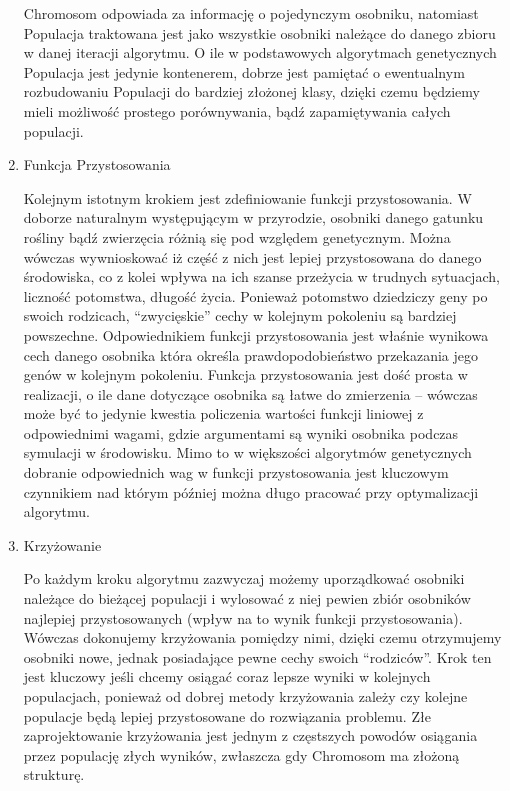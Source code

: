 \begin{par}
\begin{enumerate}
\begin{par}
		Chromosom odpowiada za informację o pojedynczym osobniku, natomiast Populacja traktowana jest jako wszystkie osobniki należące do danego zbioru w danej iteracji algorytmu. 
		O ile w podstawowych algorytmach genetycznych Populacja jest jedynie kontenerem, dobrze jest pamiętać o ewentualnym rozbudowaniu Populacji do bardziej złożonej klasy, dzięki czemu będziemy mieli możliwość prostego porównywania, bądź zapamiętywania całych populacji.
	\end{par}
\item Funkcja Przystosowania
	\begin{par}
		Kolejnym istotnym krokiem jest zdefiniowanie funkcji przystosowania.
		W doborze naturalnym występującym w przyrodzie, osobniki danego gatunku rośliny bądź zwierzęcia różnią się pod względem genetycznym. 
		Można wówczas wywnioskować iż część z nich jest lepiej przystosowana do danego środowiska, co z kolei wpływa na ich szanse przeżycia w trudnych sytuacjach, liczność potomstwa, długość życia.
		Ponieważ potomstwo dziedziczy geny po swoich rodzicach, ``zwycięskie'' cechy w kolejnym pokoleniu są bardziej powszechne.
		Odpowiednikiem funkcji przystosowania jest właśnie wynikowa cech danego osobnika która określa prawdopodobieństwo przekazania jego genów w kolejnym pokoleniu.
		Funkcja przystosowania jest dość prosta w realizacji, o ile dane dotyczące osobnika są łatwe do zmierzenia -- wówczas może być to jedynie kwestia policzenia wartości funkcji liniowej z odpowiednimi wagami, gdzie argumentami są wyniki osobnika podczas symulacji w środowisku.
		Mimo to w większości algorytmów genetycznych dobranie odpowiednich wag w funkcji przystosowania jest kluczowym czynnikiem nad którym później można długo pracować przy optymalizacji algorytmu.
	\end{par}
\item Krzyżowanie
	\begin{par}
		Po każdym kroku algorytmu zazwyczaj możemy uporządkować osobniki należące do bieżącej populacji i wylosować z niej pewien zbiór osobników najlepiej przystosowanych (wpływ na to wynik funkcji przystosowania). 
		Wówczas dokonujemy krzyżowania pomiędzy nimi, dzięki czemu otrzymujemy osobniki nowe, jednak posiadające pewne cechy swoich ``rodziców''.
		Krok ten jest kluczowy jeśli chcemy osiągać coraz lepsze wyniki w kolejnych populacjach, ponieważ od dobrej metody krzyżowania zależy czy kolejne populacje będą lepiej przystosowane do rozwiązania problemu.
		Złe zaprojektowanie krzyżowania jest jednym z częstszych powodów osiągania przez populację złych wyników, zwłaszcza gdy Chromosom ma złożoną strukturę.

\end{par}
\end{enumerate}
\end{par}
